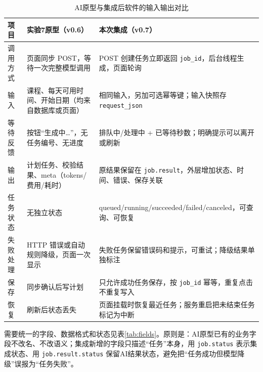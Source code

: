 \documentclass[UTF8,12pt,a4paper]{ctexart}
\begin{document}
\begin{table}[H]
\centering
\caption{AI原型与集成后软件的输入输出对比}
\label{tab:proto-vs-software}
\small
\begin{tabularx}{\textwidth}{L{2.4cm}L{5.0cm}X}
\toprule
项目 & 实验7原型（v0.6） & 本次集成（v0.7） \\
\midrule
调用方式 & 页面同步 POST，等待一次完整模型调用 & POST 创建任务立即返回 \texttt{job\_id}，后台线程生成，页面轮询 \\
输入 & 课程、每天可用时间、开始日期（均来自数据库或页面） & 相同输入，另加可选幂等键；输入快照存 \texttt{request\_json} \\
等待反馈 & 按钮“生成中…”，无任务编号、无进度 & 排队中/处理中 + 已等待秒数；明确提示可以离开或刷新 \\
输出 & 计划任务、校验结果、meta（tokens/费用/耗时） & 原结果保留在 \texttt{job.result}，外层增加状态、时间、错误、保存关联 \\
任务状态 & 无独立状态 & queued/running/succeeded/failed/canceled，可查询、可恢复 \\
失败处理 & HTTP 错误或自动规则降级，页面一次显示 & 失败任务保留错误码和提示，可重试；降级结果单独标注 \\
保存 & 同步确认后写计划 & 只允许成功任务保存，按 \texttt{job\_id} 幂等，重复点击不重复写入 \\
恢复 & 刷新后状态丢失 & 页面挂载时恢复最近任务；服务重启把未结束任务标记为中断 \\
\bottomrule
\end{tabularx}
\end{table}

需要统一的字段、数据格式和状态见表\ref{tab:fields}。原则是：AI原型已有的业务字段不改名、不改语义；集成新增的字段只描述“任务”本身，用 \texttt{job.status} 表示集成状态、用 \texttt{job.result.status} 保留AI结果状态，避免把“任务成功但模型降级”误报为“任务失败”。
\end{document}
